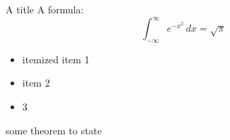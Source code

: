 \documentclass{beamer}
\begin{document}
\begin{frame}{A title}
  A formula:
  \[
    \int_{-\infty}^\infty e^{-x^2} \, dx = \sqrt{\pi}
  \]
\end{frame}

\begin{frame}
  \begin{itemize}
    \item itemized item 1
    \item item 2
    \item 3
  \end{itemize}
\end{frame}

\begin{frame}
  \begin{theorem}
    some theorem to state
    \label{mylabel}
  \end{theorem}
\end{frame}
\end{document}

